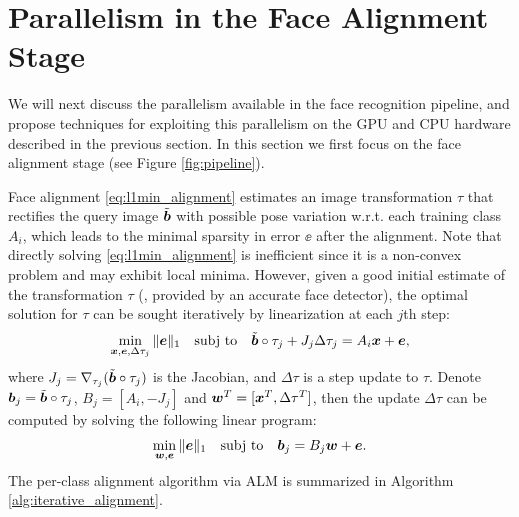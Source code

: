 \section{Parallelism in the Face Alignment Stage}
\label{sec:alignment}

We will next discuss the parallelism available in the face recognition
pipeline, and propose techniques for exploiting this parallelism on the GPU and CPU hardware 
described in the previous section.  In this section we first focus on the
face alignment stage (see Figure \ref{fig:pipeline}).

Face alignment \eqref{eq:l1min_alignment} estimates an image transformation
$\tau$ that rectifies the query image $\tilde{\boldsymbol{b}}$ with possible pose
variation w.r.t. each training class $A_i$, which leads to the minimal sparsity
in error $\ee$ after the alignment. Note that directly solving
\eqref{eq:l1min_alignment} is inefficient since it is a non-convex problem
and may exhibit local minima.
However, given a good initial estimate of the
transformation $\tau$ (\eg, provided by an accurate face detector), the optimal
solution for $\tau$ can be sought iteratively by linearization at each $j$th
step:
\begin{equation}
\min_{{\boldsymbol{x}}, {\boldsymbol{e}}, \Delta \tau_j}\|{\boldsymbol{e}}\|_1\quad \textup{subj to}\quad \tilde{\boldsymbol{b}}\circ\tau_j +  J_j\Delta \tau_j = A_i{\boldsymbol{x}} + {\boldsymbol{e}},
\end{equation}
where $J_j = \nabla_{\tau_j}(\tilde{\boldsymbol{b}}\circ\tau_j)$ is the Jacobian, and
$\Delta \tau$ is a step update to $\tau$. Denote $\boldsymbol{b}_j =
\tilde{\boldsymbol{b}}\circ\tau_j$, $B_j = [A_i, -J_j]$ and ${\boldsymbol{w}}^T = [{\boldsymbol{x}}^T, \Delta
\tau^T]$, then the update $\Delta \tau$ can be computed by solving the
following linear program:
\begin{equation}
\min_{{\boldsymbol{w}}, {\boldsymbol{e}}}\|{\boldsymbol{e}}\|_1\quad \textup{subj to}\quad \boldsymbol{b}_j = B_j{\boldsymbol{w}} + {\boldsymbol{e}}.
\label{eq:alignment-linearization}
\end{equation}
The per-class alignment algorithm via ALM is summarized in Algorithm
\ref{alg:iterative_alignment}. 
